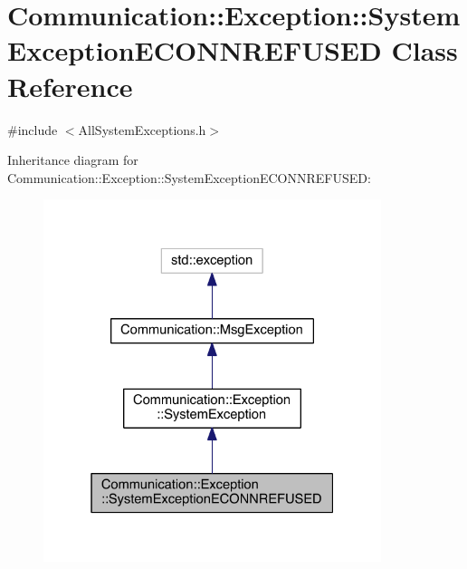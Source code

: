 \hypertarget{class_communication_1_1_exception_1_1_system_exception_e_c_o_n_n_r_e_f_u_s_e_d}{}\section{Communication\+:\+:Exception\+:\+:System\+Exception\+E\+C\+O\+N\+N\+R\+E\+F\+U\+S\+E\+D Class Reference}
\label{class_communication_1_1_exception_1_1_system_exception_e_c_o_n_n_r_e_f_u_s_e_d}


{\ttfamily \#include $<$All\+System\+Exceptions.\+h$>$}



Inheritance diagram for Communication\+:\+:Exception\+:\+:System\+Exception\+E\+C\+O\+N\+N\+R\+E\+F\+U\+S\+E\+D\+:\nopagebreak
\begin{figure}[H]
\begin{center}
\leavevmode
\includegraphics[width=280pt]{class_communication_1_1_exception_1_1_system_exception_e_c_o_n_n_r_e_f_u_s_e_d__inherit__graph}
\end{center}
\end{figure}



